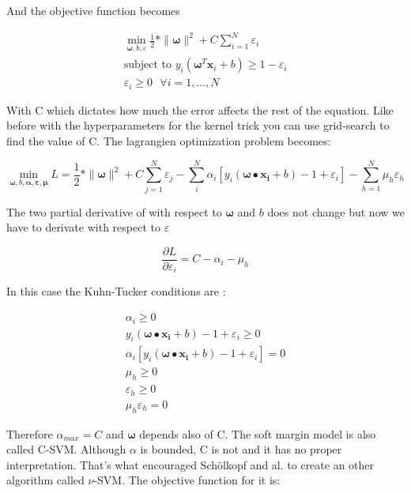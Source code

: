 \documentclass[a4paper,11pt]{article}
\numberwithin{equation}{section}
\begin{document}
And the objective function becomes


\begin{align*}
  \min_{\boldsymbol{\omega},b,\varepsilon} \frac{1}{2}*\|\boldsymbol{\omega}\|^2 + C\sum_{i=1}^{N}\varepsilon_i \\
  \mbox{subject to } y_i(\boldsymbol{\omega}^T\boldsymbol{x}_i+b) \geq 1 -\varepsilon_i\\
  \varepsilon_i \geq 0 \mbox{ } \forall i = 1,\dots,N
\end{align*}


With C which dictates how much the error affects the rest of the equation. Like before with the hyperparameters for the kernel trick you can use grid-search to find the value of C. The lagrangien optimization problem becomes:

\begin{equation}\label{eq:14}
 \min_{\boldsymbol{\omega},b,\boldsymbol{\alpha},\boldsymbol{\varepsilon},\boldsymbol{\mu}} L= \frac{1}{2}*\|\boldsymbol{\omega}\|^2 + C\sum_{j=1}^{N}\varepsilon_j- \sum_{i}^{N}\alpha_i[y_i(\boldsymbol{\omega}\bullet{\boldsymbol{x_i}}+b)-1+\varepsilon_i]-\sum_{h=1}^{N}\mu_h\varepsilon_h
\end{equation}

The two partial derivative of with respect to $ \boldsymbol{\omega} $ and $b$ does not change but now we have to derivate with respect to $ \varepsilon $

\begin{equation}\label{eq:15}
 \frac{\partial L}{\partial{\varepsilon_i} } = C-\alpha_i - \mu_h
\end{equation}

In this case the Kuhn-Tucker conditions are :

\begin{align*}
  \alpha_i \geq 0 \\
  y_i(\boldsymbol{\omega}\bullet{\boldsymbol{x_i}}+b)-1 + \varepsilon_i \geq 0 \\
  \alpha_i[y_i(\boldsymbol{\omega}\bullet{\boldsymbol{x_i}}+b)-1 + \varepsilon_i] = 0 \\
  \mu_h \geq 0 \\
  \varepsilon_h \geq 0 \\
  \mu_h\varepsilon_h = 0
\end{align*}


Therefore $ \alpha_{max} = C $ and $\boldsymbol{\omega}$ depends also of C. The soft margin model is also called C-SVM. Although $\alpha$ is bounded, C is not and it has no proper interpretation. That's what encouraged Sch{\"o}lkopf and al. \cite{scholkopf2000new} to create an other algorithm called $\nu$-SVM. The objective function for it is:
\end{document}
